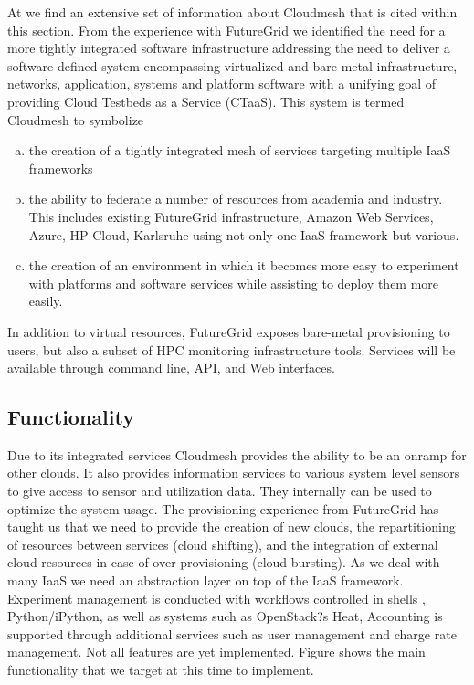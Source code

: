 \documentclass{tex/sig-alternate}
\begin{document}
At \cite{github-cloudmesh} we find an extensive set of information about Cloudmesh that is cited within this section. 
From the experience with FutureGrid we identified the need for a more tightly integrated software infrastructure addressing the need to deliver a software-defined system encompassing virtualized and bare-metal infrastructure, networks, application, systems and platform software with a unifying goal of providing Cloud Testbeds as a Service (CTaaS). This system is termed Cloudmesh to symbolize 


\begin{enumerate}[(a)]


\item the creation of a tightly integrated mesh of services targeting multiple IaaS frameworks 


\item the ability to federate a number of resources from academia and industry. This includes existing FutureGrid infrastructure, Amazon Web Services, Azure, HP Cloud, Karlsruhe using not only one IaaS framework but various. 


\item the creation of an environment in which it becomes more easy to experiment with platforms and software services while assisting to deploy them more easily.  


\end{enumerate}


In addition to virtual resources, FutureGrid exposes bare-metal provisioning to users, but also a subset of HPC monitoring infrastructure tools. Services will be available through command line, API, and Web interfaces.


\subsection{Functionality}


Due to its integrated services Cloudmesh provides the ability to be an onramp for other clouds. It also provides information services to various system level sensors to give access to sensor and utilization data. They internally can be used to optimize the system usage. The provisioning experience from FutureGrid has taught us that we need to provide the creation of new clouds, the repartitioning of resources between services (cloud shifting), and the integration of external cloud resources in case of over provisioning (cloud bursting). As we deal with many IaaS we need an abstraction layer on top of the IaaS framework. Experiment management is conducted with workflows controlled in shells \cite{cmd3}, Python/iPython, as well as systems such as OpenStack?s Heat, Accounting is supported through additional services such as user management and charge rate management. Not all features are yet implemented. Figure \label{F:cm-func} shows the main functionality that we target at this time to implement.
\end{document}
